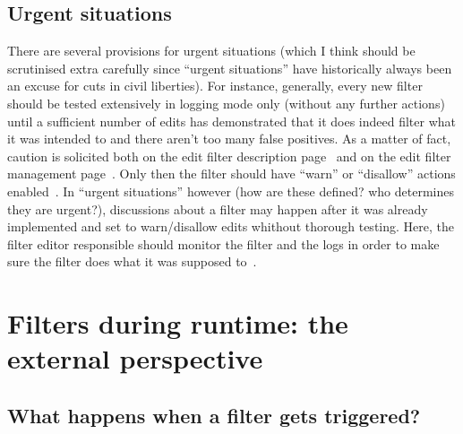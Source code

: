 \subsection{Urgent situations}

There are several provisions for urgent situations (which I think should be scrutinised extra carefully since ``urgent situations'' have historically always been an excuse for cuts in civil liberties).
For instance, generally, every new filter should be tested extensively in logging mode only (without any further actions) until a sufficient number of edits has demonstrated that it does indeed filter what it was intended to and there aren't too many false positives.
As a matter of fact, caution is solicited both on the edit filter description page~\cite{Wikipedia:EditFilter} and on the edit filter management page~\cite{Wikipedia:EditFilterManagement}.
Only then the filter should have ``warn'' or ``disallow'' actions enabled~\cite{Wikipedia:EditFilter}.
In ``urgent situations'' however (how are these defined? who determines they are urgent?), discussions about a filter may happen after it was already implemented and set to warn/disallow edits whithout thorough testing.
Here, the filter editor responsible should monitor the filter and the logs in order to make sure the filter does what it was supposed to~\cite{Wikipedia:EditFilter}.


\section{Filters during runtime: the external perspective}
\subsection{What happens when a filter gets triggered?}

